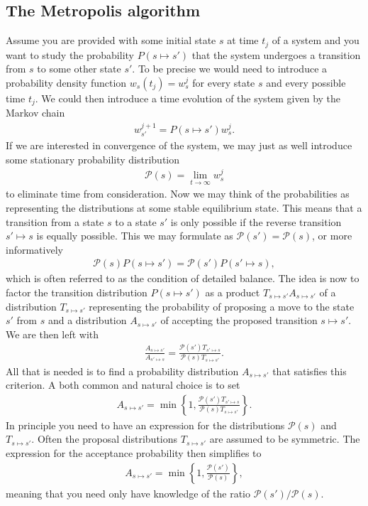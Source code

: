 \documentclass[twoside,utf8]{article}
\newcommand{\EQU}[1] { \begin{equation*} \begin{split} #1 \end{split} \end{equation*} }
\begin{document}
\subsection{The Metropolis algorithm}
Assume you are provided with some initial state $s$ at time $t_j$ of a system and you want to study the probability $P(s\mapsto s')$ that the system undergoes a transition from $s$ to some other state $s'$. To be precise we would need to introduce a probability density function $w_s(t_j)=w_s^j$ for every state $s$ and every possible time $t_j$. We could then introduce a time evolution of the system given by the Markov chain
\EQU{
w_{s'}^{j+1}=P(s\mapsto s')w_{s}^j.
}
If we are interested in convergence of the system, we may just as well introduce some stationary probability distribution 
\EQU{
\mathcal{P}(s)=\lim_{t\rightarrow \infty}w_{s}^j
}
to eliminate time from consideration. Now we may think of the probabilities as representing the distributions at some stable equilibrium state. This means that a transition from a state $s$ to a state $s'$ is only possible if the reverse transition $s'\mapsto s$ is equally possible. This we may formulate as $\mathcal{P}(s')=\mathcal{P}(s)$, or more informatively
\EQU{
\mathcal{P}(s)P(s\mapsto s') = \mathcal{P}(s')P(s'\mapsto s),
}
which is often referred to as the condition of detailed balance. The idea is now to factor the transition distribution $P(s\mapsto s')$ as a product $T_{s\mapsto s'}A_{s\mapsto s'}$ of a distribution $T_{s\mapsto s'}$ representing the probability of proposing a move to the state $s'$ from $s$ and a distribution $A_{s\mapsto s'}$ of accepting the proposed transition $s\mapsto s'$. We are then left with
\EQU{
\frac{A_{s\mapsto s'}}{A_{s'\mapsto s}}=\frac{ \mathcal{P}(s')T_{s'\mapsto s}}{ \mathcal{P}(s)T_{s\mapsto s'}}.
}
All that is needed is to find a probability distribution $A_{s\mapsto s'}$ that satisfies this criterion. A both common and natural choice is to set
\EQU{
A_{s\mapsto s'} = \min \left\{ 1, \frac{ \mathcal{P}(s')T_{s'\mapsto s}}{ \mathcal{P}(s)T_{s\mapsto s'}} \right\}.
}
In principle you need to have an expression for the distributions $\mathcal{P}(s)$ and $T_{s\mapsto s'}$. Often the proposal distributions $T_{s\mapsto s'}$ are assumed to be symmetric. The expression for the acceptance probability then simplifies to
\EQU{
A_{s\mapsto s'} = \min \left\{ 1, \frac{ \mathcal{P}(s')}{ \mathcal{P}(s)} \right\},
}
meaning that you need only have knowledge of the ratio $\mathcal{P}(s') / \mathcal{P}(s)$.
\end{document}
